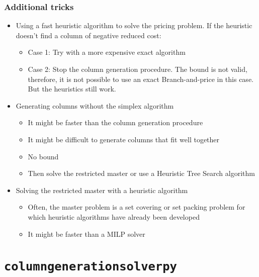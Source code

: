 \documentclass[10pt]{beamer}
\begin{document}
\begin{frame}
  \frametitle{Additional tricks}

  \begin{itemize}
    \item Using a fast heuristic algorithm to solve the pricing problem. If the heuristic doesn't find a column of negative reduced cost:
      \begin{itemize}
        \item Case 1: Try with a more expensive exact algorithm
        \item Case 2: Stop the column generation procedure. The bound is not valid, therefore, it is not possible to use an exact Branch-and-price in this case. But the heuristics still work.
      \end{itemize}
    \item Generating columns without the simplex algorithm
      \begin{itemize}
        \item It might be faster than the column generation procedure
        \item It might be difficult to generate columns that fit well together
        \item No bound
        \item Then solve the restricted master or use a Heuristic Tree Search algorithm
      \end{itemize}
    \item Solving the restricted master with a heuristic algorithm
      \begin{itemize}
        \item Often, the master problem is a set covering or set packing problem for which heuristic algorithms have already been developed
        \item It might be faster than a MILP solver
      \end{itemize}
  \end{itemize}
\end{frame}

\section{\texttt{columngenerationsolverpy}}
\end{document}
